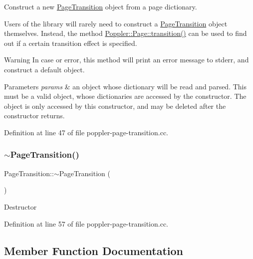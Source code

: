 Construct a new \hyperlink{class_poppler_1_1_page_transition}{Page\+Transition} object from a page dictionary. 

Users of the library will rarely need to construct a \hyperlink{class_poppler_1_1_page_transition}{Page\+Transition} object themselves. Instead, the method \hyperlink{class_poppler_1_1_page_aff7331566a9cbf659f625f73ee05f746}{Poppler\+::\+Page\+::transition()} can be used to find out if a certain transition effect is specified.

\begin{DoxyWarning}{Warning}
In case or error, this method will print an error message to stderr, and construct a default object.
\end{DoxyWarning}

\begin{DoxyParams}{Parameters}
{\em params} & an object whose dictionary will be read and parsed. This must be a valid object, whose dictionaries are accessed by the constructor. The object is only accessed by this constructor, and may be deleted after the constructor returns. \\
\hline
\end{DoxyParams}


Definition at line 47 of file poppler-\/page-\/transition.\+cc.

\mbox{\label{class_poppler_1_1_page_transition_a6a7dd3215cb63628a5a40e8082a5f89a}} 
\subsubsection{\texorpdfstring{$\sim$\+Page\+Transition()}{~PageTransition()}}
{\footnotesize\ttfamily Page\+Transition\+::$\sim$\+Page\+Transition (\begin{DoxyParamCaption}{ }\end{DoxyParamCaption})}

Destructor 

Definition at line 57 of file poppler-\/page-\/transition.\+cc.



\subsection{Member Function Documentation}
\mbox{\label{class_poppler_1_1_page_transition_a1e860a623563e2fa98b0ad5c96bf682b}} 
